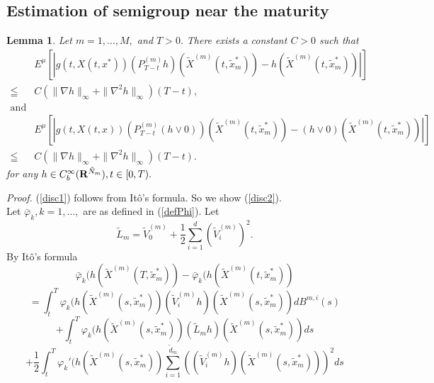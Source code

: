 \documentclass[12pt]{article}
\newtheorem{lem}[thm]{Lemma}%
\begin{document}
\subsection{Estimation of semigroup near the maturity}
\begin{lem}\label{discLem1}
Let $m=1,\ldots,M,$ and $T>0.$ There exists a constant $C >0$ such that
\begin{align}
&E^{\mu}[ |g(t,X(t,x^*))(P^{(m)}_{T-t}h)(\tilde{X}^{(m)}(t,\tilde{x}_m^*))-h(\tilde{X}^{(m)}(t,\tilde{x}_m^*))|]\nonumber \\ 
\leqq &C(\|\nabla h\|_{\infty}+ \|\nabla^2 h\|_{\infty} )(T-t),\label{disc1}\\
\text{and} \nonumber\\
&E^{\mu}[ |g(t,X(t,x))(P^{(m)}_{T-t}(h\vee 0))(\tilde{X}^{(m)}(t,\tilde{x}_m^*))-(h\vee 0)(\tilde{X}^{(m)}(t,\tilde{x}_m^*))|] \nonumber \\
\leqq &C(\|\nabla h\|_{\infty}+ \|\nabla^2 h\|_{\infty} )(T-t) \label{disc2}.
\end{align}
for  any $h \in C_b^{\infty}({\bf R}^{\tilde{N}_m}), t \in [0, T).$
\end{lem}
{\it Proof.}
(\ref{disc1}) follows from It\^o's formula. So we show (\ref{disc2}).\\
Let $\bar{\varphi}_k, k=1,\ldots,$ are as defined in (\ref{defPhi}). Let
$$\tilde{L}_m=\tilde{V}^{(m)}_{0}+\frac{1}{2}\sum_{i=1}^{d}(\tilde{V}^{(m)}_{i})^2.$$
By It\^o's formula
$$\bar{\varphi}_k(h(\tilde{X}^{(m)}(T,\tilde{x}_m^*))-\bar{\varphi}_k(h(\tilde{X}^{(m)}(t,\tilde{x}_m^*))$$
$$=\int_t^T \varphi_k(h(\tilde{X}^{(m)}(s,\tilde{x}_m^*)) (\tilde{V}^{(m)}_{i}h)(\tilde{X}^{(m)}(s,\tilde{x}_m^*)) dB^{m,i}(s)$$
$$+\int_t^T \varphi_k(h(\tilde{X}^{(m)}(s,\tilde{x}_m^*)) (\tilde{L}_m h)(\tilde{X}^{(m)}(s,\tilde{x}_m^*)) ds$$
$$+\frac{1}{2} \int_t^T \varphi_k' (h(\tilde{X}^{(m)}(s,\tilde{x}_m^*)) \sum_{i=1}^{\tilde{d}_m} ((\tilde{V}^{(m)}_{i} h)(\tilde{X}^{(m)}(s,\tilde{x}_m^*)))^2 ds$$
\end{document}
